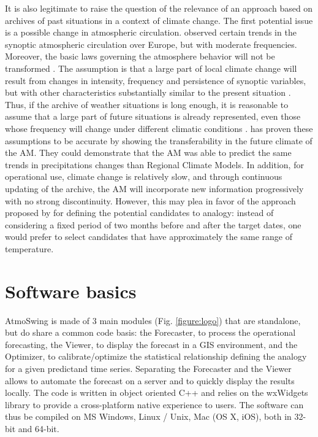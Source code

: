 \documentclass[review]{elsarticle}
\begin{document}
It is also legitimate to raise the question of the relevance of an approach based on archives of past situations in a context of climate change. The first potential issue is a possible change in atmospheric circulation. \citet{Philipp2007} observed certain trends in the synoptic atmospheric circulation over Europe, but with moderate frequencies. Moreover, the basic laws governing the atmosphere behavior will not be transformed \citep{Hewitson1996}. The assumption is that a large part of local climate change will result from changes in intensity, frequency and persistence of synoptic variables, but with other characteristics substantially similar to the present situation \citep{Hewitson1996}. Thus, if the archive of weather situations is long enough, it is reasonable to assume that a large part of future situations is already represented, even those whose frequency will change under different climatic conditions \citep{Wetterhall2005}. \citet{Dayon2015} has proven these assumptions to be accurate by showing the transferability in the future climate of the AM. They could demonstrate that the AM was able to predict the same trends in precipitations changes than Regional Climate Models. In addition, for operational use, climate change is relatively slow, and through continuous updating of the archive, the AM will incorporate new information progressively with no strong discontinuity. However, this may plea in favor of the approach proposed by \cite{BenDaoud2010} for defining the potential candidates to analogy: instead of considering a fixed period of two months before and after the target dates, one would prefer to select candidates that have approximately the same range of temperature.


\section{Software basics}
\label{sec:atmoswing}

AtmoSwing is made of 3 main modules (Fig. \ref{figure:logo}) that are standalone, but do share a common code basis: the Forecaster, to process the operational forecasting, the Viewer, to display the forecast in a GIS environment, and the Optimizer, to calibrate/optimize the statistical relationship defining the analogy for a given predictand time series. Separating the Forecaster and the Viewer allows to automate the forecast on a server and to quickly display the results locally. The code is written in object oriented C++ and relies on the wxWidgets \citep{Smart2006} library to provide a cross-platform native experience to users. The software can thus be compiled on MS Windows, Linux / Unix, Mac (OS X, iOS), both in 32-bit and 64-bit.
\end{document}
